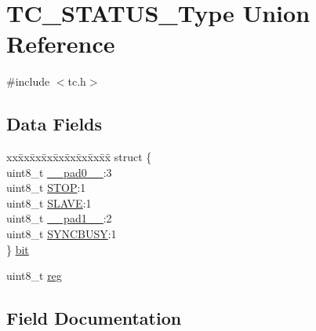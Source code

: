 \hypertarget{union_t_c___s_t_a_t_u_s___type}{}\section{T\+C\+\_\+\+S\+T\+A\+T\+U\+S\+\_\+\+Type Union Reference}
\label{union_t_c___s_t_a_t_u_s___type}


{\ttfamily \#include $<$tc.\+h$>$}

\subsection*{Data Fields}
\begin{DoxyCompactItemize}
\item 
\begin{tabbing}
xx\=xx\=xx\=xx\=xx\=xx\=xx\=xx\=xx\=\kill
struct \{\\
\>uint8\_t \mbox{\hyperlink{union_t_c___s_t_a_t_u_s___type_a8b4eebe79ded0459acec2f4950102ba3}{\_\_pad0\_\_}}:3\\
\>uint8\_t \mbox{\hyperlink{union_t_c___s_t_a_t_u_s___type_aa328a90a4697c4eedde37d25cdf30bd3}{STOP}}:1\\
\>uint8\_t \mbox{\hyperlink{union_t_c___s_t_a_t_u_s___type_ac4995a39c74d2d1bfa41e85fbc0b8b4e}{SLAVE}}:1\\
\>uint8\_t \mbox{\hyperlink{union_t_c___s_t_a_t_u_s___type_a77f12d2e278bd5c07712648ac0df5e08}{\_\_pad1\_\_}}:2\\
\>uint8\_t \mbox{\hyperlink{union_t_c___s_t_a_t_u_s___type_abb30254758e23bd24824e436a1aa8716}{SYNCBUSY}}:1\\
\} \mbox{\hyperlink{union_t_c___s_t_a_t_u_s___type_a6f48713ed1f2d1fd4f230f611eb5fdb4}{bit}}\\

\end{tabbing}\item 
uint8\+\_\+t \mbox{\hyperlink{union_t_c___s_t_a_t_u_s___type_a9428adc9af4653a2050e2536b55dec8d}{reg}}
\end{DoxyCompactItemize}


\subsection{Field Documentation}
\mbox{\label{union_t_c___s_t_a_t_u_s___type_a8b4eebe79ded0459acec2f4950102ba3}} 
